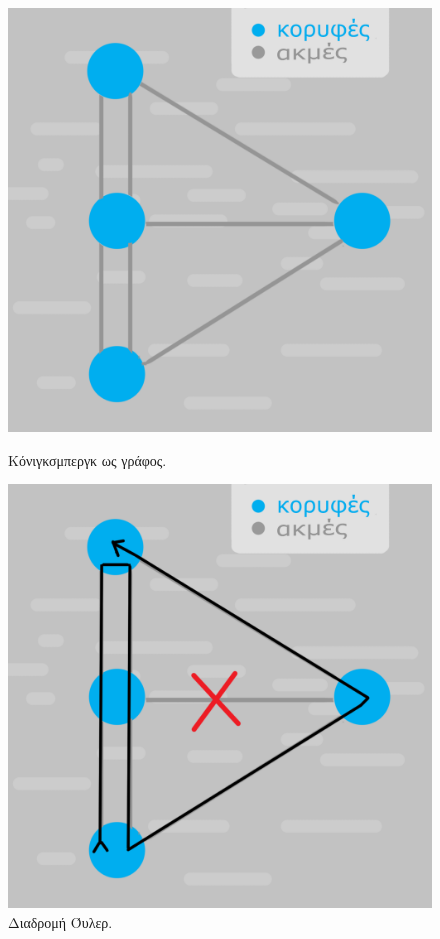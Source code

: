 \begin{figure}[ht]
    \begin{minipage}[c]{.46\linewidth}
        \centering
        \includegraphics[scale=0.15]{2947_thesis/pictures/konigsberGraph.png}
        \caption{Κόνιγκσμπεργκ ως γράφος.}
        \label{3}
    \end{minipage}
    \hfill%
    \begin{minipage}[c]{.46\linewidth}
        \centering
        \includegraphics[scale=0.15]{2947_thesis/pictures/konigsbergEuler.png}
        \caption{Διαδρομή Όυλερ.}
        \label{4}
    \end{minipage}
\end{figure} 

